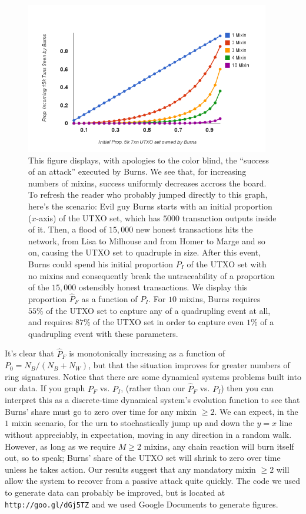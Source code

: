 \documentclass{mrl}
\begin{document}
\begin{figure}[!h]
\centering
\includegraphics[width=0.95\textwidth,height=0.95\textheight,keepaspectratio]{burns.png}
\caption{This figure displays, with apologies to the color blind, the ``success of an attack'' executed by Burns. We see that, for increasing numbers of mixins, success uniformly decreases accross the board. To refresh the reader who probably jumped directly to this graph,  here's the scenario: Evil guy Burns starts with an initial proportion ($x$-axis) of the UTXO set, which has $5000$ transaction outputs inside of it. Then, a flood of $15,000$ new honest transactions hits the network, from Lisa to Milhouse and from Homer to Marge and so on, causing the UTXO set to quadruple in size. After this event, Burns could spend his initial proportion $P_I$ of the UTXO set with no mixins and consequently break the untraceability of a proportion of the $15,000$ ostensibly honest transactions. We display this proportion $\widehat{P}_F$ as a function of $P_I$. For $10$ mixins, Burns requires $55\%$ of the UTXO set to capture any of a quadrupling event at all, and requires $87\%$ of the UTXO set in order to capture even $1\%$ of a quadrupling event with these parameters.}
\label{fig1}
\end{figure}

It's clear that $\widehat{P}_F$ is monotonically increasing as a function of $P_0 = N_B/(N_B + N_W)$, but that the situation improves for greater numbers of ring signatures. Notice that there are some dynamical systems problems built into our data. If you graph $P_F$ vs. $P_I$, (rather than our $\widehat{P}_F$ vs. $P_I$) then you can interpret this as a discrete-time dynamical system's evolution function to see that Burns' share must go to zero over time for any mixin $\geq 2$. We can expect, in the $1$ mixin scenario, for the urn to stochastically jump up and down the $y=x$ line without appreciably, in expectation, moving in any direction in a random walk. However, as long as we require $M \geq 2$ mixins, any chain reaction will burn itself out, so to speak; Burns' share of the UTXO set will shrink to zero over time unless he takes action. Our results suggest that any mandatory mixin $\geq 2$ will allow the system to recover from a passive attack quite quickly. The code we used to generate data can probably be improved, but is located at \texttt{http://goo.gl/dGj5TZ} and we used Google Documents to generate figures.
\end{document}
